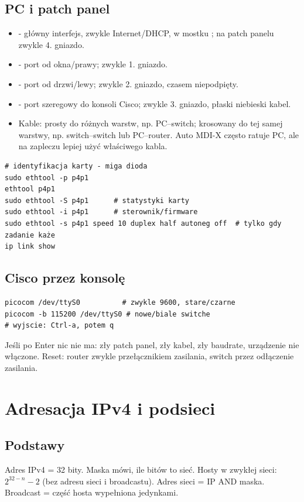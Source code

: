 \documentclass[10pt,a5paper,twoside]{article}
\newcommand{\code}[1]{\texttt{\detokenize{#1}}}
\begin{document}
\subsection{PC i patch panel}
\begin{itemize}
  \item \code{em1} - główny interfejs, zwykle Internet/DHCP, w mostku \code{br0}; na patch panelu zwykle 4. gniazdo.
  \item \code{p4p1} - port od okna/prawy; zwykle 1. gniazdo.
  \item \code{p4p2} - port od drzwi/lewy; zwykle 2. gniazdo, czasem niepodpięty.
  \item \code{/dev/ttyS0} - port szeregowy do konsoli Cisco; zwykle 3. gniazdo, płaski niebieski kabel.
  \item Kable: prosty do różnych warstw, np. PC--switch; krosowany do tej samej warstwy, np. switch--switch lub PC--router. Auto MDI-X często ratuje PC, ale na zapleczu lepiej użyć właściwego kabla.
\end{itemize}
\begin{lstlisting}
# identyfikacja karty - miga dioda
sudo ethtool -p p4p1
ethtool p4p1
sudo ethtool -S p4p1      # statystyki karty
sudo ethtool -i p4p1      # sterownik/firmware
sudo ethtool -s p4p1 speed 10 duplex half autoneg off  # tylko gdy zadanie każe
ip link show
\end{lstlisting}

\subsection{Cisco przez konsolę}
\begin{lstlisting}
picocom /dev/ttyS0          # zwykle 9600, stare/czarne
picocom -b 115200 /dev/ttyS0 # nowe/biale switche
# wyjscie: Ctrl-a, potem q
\end{lstlisting}
Jeśli po Enter nic nie ma: zły patch panel, zły kabel, zły baudrate, urządzenie nie włączone. Reset: router zwykle przełącznikiem zasilania, switch przez odłączenie zasilania.

\section{Adresacja IPv4 i podsieci}
\subsection{Podstawy}
Adres IPv4 = 32 bity. Maska \code{/n} mówi, ile bitów to sieć. Hosty w zwykłej sieci: \(2^{32-n}-2\) (bez adresu sieci i broadcastu). Adres sieci = IP AND maska. Broadcast = część hosta wypełniona jedynkami.
\end{document}
